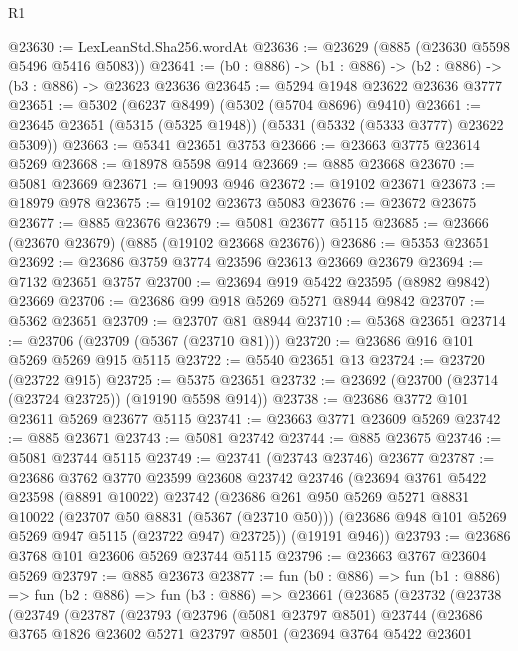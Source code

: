\begin{lexlean}{R1}
\begin{coremodule}
@23630 := LexLeanStd.Sha256.wordAt
@23636 := @23629 (@885 (@23630 @5598 @5496 @5416 @5083))
@23641 := (b0 : @886) -> (b1 : @886) -> (b2 : @886) -> (b3 : @886) -> @23623 @23636
@23645 := @5294 @1948 @23622 @23636 @3777
@23651 := @5302 (@6237 @8499) (@5302 (@5704 @8696) @9410)
@23661 := @23645 @23651 (@5315 (@5325 @1948)) (@5331 (@5332 (@5333 @3777) @23622 @5309))
@23663 := @5341 @23651 @3753
@23666 := @23663 @3775 @23614 @5269
@23668 := @18978 @5598 @914
@23669 := @885 @23668
@23670 := @5081 @23669
@23671 := @19093 @946
@23672 := @19102 @23671
@23673 := @18979 @978
@23675 := @19102 @23673 @5083
@23676 := @23672 @23675
@23677 := @885 @23676
@23679 := @5081 @23677 @5115
@23685 := @23666 (@23670 @23679) (@885 (@19102 @23668 @23676))
@23686 := @5353 @23651
@23692 := @23686 @3759 @3774 @23596 @23613 @23669 @23679
@23694 := @7132 @23651 @3757
@23700 := @23694 @919 @5422 @23595 (@8982 @9842) @23669
@23706 := @23686 @99 @918 @5269 @5271 @8944 @9842
@23707 := @5362 @23651
@23709 := @23707 @81 @8944
@23710 := @5368 @23651
@23714 := @23706 (@23709 (@5367 (@23710 @81)))
@23720 := @23686 @916 @101 @5269 @5269 @915 @5115
@23722 := @5540 @23651 @13
@23724 := @23720 (@23722 @915)
@23725 := @5375 @23651
@23732 := @23692 (@23700 (@23714 (@23724 @23725)) (@19190 @5598 @914))
@23738 := @23686 @3772 @101 @23611 @5269 @23677 @5115
@23741 := @23663 @3771 @23609 @5269
@23742 := @885 @23671
@23743 := @5081 @23742
@23744 := @885 @23675
@23746 := @5081 @23744 @5115
@23749 := @23741 (@23743 @23746) @23677
@23787 := @23686
    @3762
    @3770
    @23599
    @23608
    @23742
    @23746
    (@23694
      @3761
      @5422
      @23598
      (@8891 @10022)
      @23742
      (@23686
        @261
        @950
        @5269
        @5271
        @8831
        @10022
        (@23707 @50 @8831 (@5367 (@23710 @50)))
        (@23686 @948 @101 @5269 @5269 @947 @5115 (@23722 @947) @23725))
      (@19191 @946))
@23793 := @23686 @3768 @101 @23606 @5269 @23744 @5115
@23796 := @23663 @3767 @23604 @5269
@23797 := @885 @23673
@23877 := fun (b0 : @886) =>
  fun (b1 : @886) =>
  fun (b2 : @886) =>
  fun (b3 : @886) =>
  @23661
    (@23685
      (@23732
        (@23738
          (@23749
            (@23787
              (@23793
                (@23796
                  (@5081 @23797 @8501)
                  @23744
                  (@23686
                    @3765
                    @1826
                    @23602
                    @5271
                    @23797
                    @8501
                    (@23694
                      @3764
                      @5422
                      @23601

\end{coremodule}
\end{lexlean}
